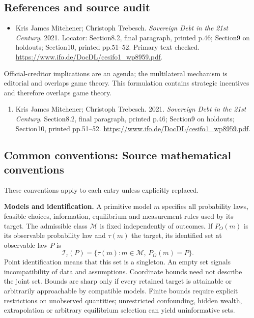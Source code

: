 \documentclass[11pt,a4paper]{article}
\begin{document}
\subsection*{References and source audit}
\begin{itemize}
\item Kris James Mitchener; Christoph Trebesch. \emph{Sovereign Debt in the 21st Century}. 2021. Locator: Section8.2, final paragraph, printed p.46; Section9 on holdouts; Section10, printed pp.51--52. Primary text checked. \url{https://www.ifo.de/DocDL/cesifo1_wp8959.pdf}.
\end{itemize}
Official-creditor implications are an agenda; the multilateral mechanism is editorial and overlaps game theory. This formulation contains strategic incentives and therefore overlaps game theory.
\begin{enumerate}\raggedright
\item\hypertarget{definitions:source:30007537:1}{} Kris James Mitchener; Christoph Trebesch. 2021. \emph{Sovereign Debt in the 21st Century}. Section8.2, final paragraph, printed p.46; Section9 on holdouts; Section10, printed pp.51--52.
\url{https://www.ifo.de/DocDL/cesifo1_wp8959.pdf}.
\end{enumerate}

\subsection*{Common conventions: Source mathematical conventions}

These conventions apply to each entry unless explicitly replaced.

\textbf{Models and identification.} A primitive model \(m\) specifies all probability laws, feasible choices, information, equilibrium and measurement rules used by its target. The admissible class \(\mathcal M\) is fixed independently of outcomes. If \(P_O(m)\) is its observable probability law and \(\tau(m)\) the target, its identified set at observable law \(P\) is
\[
 \mathcal I_\tau(P)=\{\tau(m):m\in\mathcal M,\ P_O(m)=P\}.
\]
Point identification means that this set is a singleton. An empty set signals incompatibility of data and assumptions. Coordinate bounds need not describe the joint set. Bounds are sharp only if every retained target is attainable or arbitrarily approachable by compatible models. Finite bounds require explicit restrictions on unobserved quantities; unrestricted confounding, hidden wealth, extrapolation or arbitrary equilibrium selection can yield uninformative sets.
\end{document}
